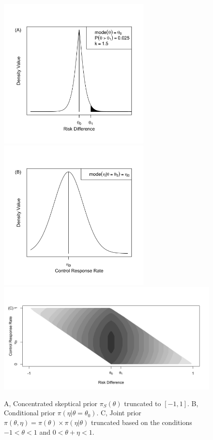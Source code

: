 \documentclass[AMA,STIX1COL,doublespace]{WileyNJD-v2}
\begin{document}
\begin{figure}
\begin{center}
\includegraphics[width=3in]{figure5a_NEW.png}
\includegraphics[width=3in]{figure5b_NEW.png}
\includegraphics[width=6in]{figure5a.png}
\caption{A, Concentrated skeptical prior $\pi_S(\theta)$ truncated to $[-1,1]$. B, Conditional prior $\pi(\eta|\theta=\theta_0)$. C, Joint prior $\pi(\theta,\eta)=\pi(\theta)\times\pi(\eta|\theta)$ truncated based on the conditions $-1<\theta<1$ and $0<\theta+\eta<1$.}
\label{fig:figure5}
 \end{center}
\end{figure}
\end{document}
